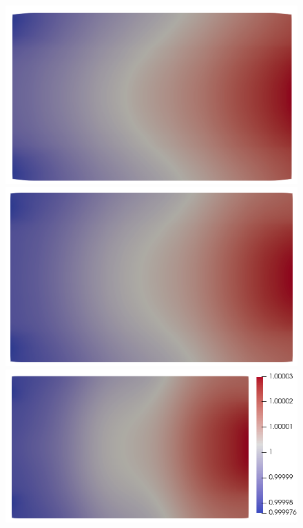 \documentclass{article}
\begin{document}
\begin{figure}
\begin{minipage}{0.9\textwidth}
    \hspace{0.04cm}
    \includegraphics[scale=0.27]{slice_ne_T-1_lambda-0_8-2-2.png}\hspace{0.04cm}
    \includegraphics[scale=0.27]{slice_ne_T-1_lambda-0_16-3-3.png}\hspace{0.03cm}
    \includegraphics[scale=0.27]{slice_ne_T-1_lambda-0_32-3-4.png}
    

\end{minipage}
\end{figure}
\end{document}
